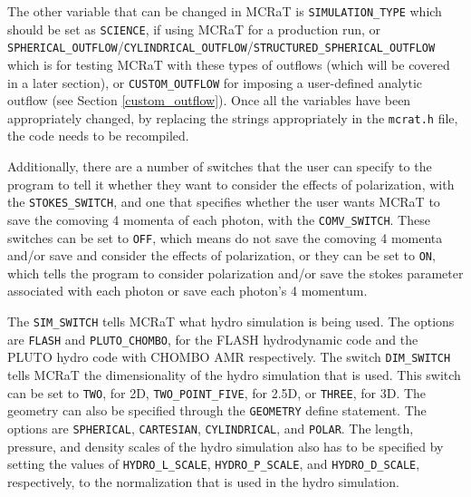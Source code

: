 \documentclass[12pt,a4paper]{article}
\begin{document}
The other variable that can be changed in MCRaT is \texttt{SIMULATION\_TYPE} which should be set as \texttt{SCIENCE}, if using MCRaT for a production run, or \texttt{SPHERICAL\_OUTFLOW}/\texttt{CYLINDRICAL\_OUTFLOW}/\texttt{STRUCTURED\_SPHERICAL\_OUTFLOW} which is for testing MCRaT with these types of outflows (which will be covered in a later section), or \texttt{CUSTOM\_OUTFLOW} for imposing a user-defined analytic outflow (see Section \ref{custom_outflow}). Once all the variables have been appropriately changed, by replacing the strings appropriately in the \texttt{mcrat.h} file, the code needs to be recompiled.

Additionally, there are a number of switches that the user can specify to the program to tell it whether they want to consider the effects of polarization, with the \texttt{STOKES\_SWITCH}, and one that specifies whether the user wants MCRaT to save the comoving 4 momenta of each photon, with the \texttt{COMV\_SWITCH}. These switches can be set to \texttt{OFF}, which means do not save the comoving 4 momenta and/or save and consider the effects of polarization, or they can be set to \texttt{ON}, which tells the program to consider polarization and/or save the stokes parameter associated with each photon or save each photon's 4 momentum.

The \texttt{SIM\_SWITCH} tells MCRaT what hydro simulation is being used. The options are \texttt{FLASH} and \texttt{PLUTO\_CHOMBO}, for the FLASH hydrodynamic code and the PLUTO hydro code with CHOMBO AMR respectively. The switch \texttt{DIM\_SWITCH} tells MCRaT the dimensionality of the hydro simulation that is used. This switch can be set to \texttt{TWO}, for 2D, \texttt{TWO\_POINT\_FIVE}, for 2.5D, or \texttt{THREE}, for 3D. The geometry can also be specified through the \texttt{GEOMETRY} define statement. The options are \texttt{SPHERICAL}, \texttt{CARTESIAN}, \texttt{CYLINDRICAL}, and \texttt{POLAR}. The length, pressure, and density scales of the hydro simulation also has to be specified by setting the values of \texttt{HYDRO\_L\_SCALE}, \texttt{HYDRO\_P\_SCALE}, and \texttt{HYDRO\_D\_SCALE}, respectively, to the normalization that is used in the hydro simulation.
\end{document}

